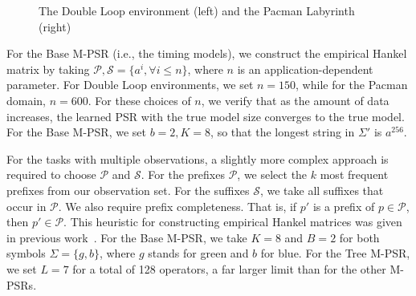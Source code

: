 \documentclass[letterpaper]{article}
\newcommand{\Ps}{\mathcal{P}}
\newcommand{\Ss}{\mathcal{S}}
\begin{document}
\begin{figure}[t]
\centering
{}
%
{}
\caption{The Double Loop environment (left) and the Pacman Labyrinth (right)\label{overflow}\vspace*{-4mm}}
\end{figure}

For the Base M-PSR (i.e., the timing models), we construct the empirical Hankel matrix by taking $\Ps, \Ss = \{a^i, \forall i \leq n\}$, where $n$ is an application-dependent parameter. For Double Loop environments, we set $n = 150$, while for the Pacman domain, $n = 600$. For these choices of $n$, we verify that as the amount of data increases, the learned PSR with the true model size converges to the true model. For the Base M-PSR, we set $b=2, K=8$, so that the longest string in $\Sigma'$ is $a^{256}$.

For the tasks with multiple observations, a slightly more complex approach is required to choose $\Ps$ and $\Ss$. For the prefixes $\Ps$, we select the $k$ most frequent prefixes from our observation set. For the suffixes $\Ss$, we take all suffixes that occur in $\Ps$. We also require prefix completeness. That is, if $p'$ is a prefix of $p \in \Ps$, then $p' \in \Ps$. This heuristic for constructing empirical Hankel matrices was given in previous work~\cite{icml12}. For the Base M-PSR, we take $K=8$ and $B=2$ for both symbols $\Sigma=\{g,b\}$, where $g$ stands for green and $b$ for blue. For the Tree M-PSR, we set $L=7$ for a total of 128 operators, a far larger limit  than for the other M-PSRs. 
\end{document}
